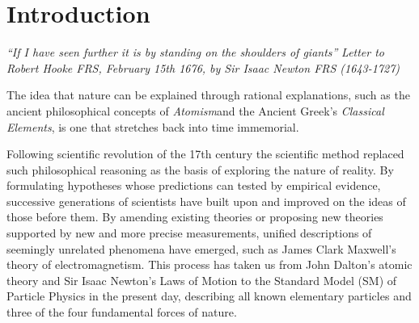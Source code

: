 \chapter{Introduction}\label{chapter:intro}

\emph{``If I have seen further it is by standing on the shoulders of giants''}
\emph{Letter to Robert Hooke FRS, February 15th 1676, by Sir Isaac Newton FRS (1643-1727)}

The idea that nature can be explained through rational explanations, such as the ancient philosophical concepts of \emph{Atomism}and the Ancient Greek's \emph{Classical Elements}, is one that stretches back into time immemorial.

Following scientific revolution of the 17th century the scientific method replaced such philosophical reasoning as the basis of exploring the nature of reality.
By formulating hypotheses whose predictions can tested by empirical evidence, successive generations of scientists
have built upon and improved on the ideas of those before them.
By amending existing theories or proposing new theories supported by new and more precise measurements, unified descriptions of seemingly unrelated phenomena have emerged, such as James Clark Maxwell's theory of electromagnetism.
This process has taken us from John Dalton's atomic theory and Sir Isaac Newton's Laws of Motion to the Standard Model (SM) of Particle Physics in the present day, describing all known elementary particles and three of the four fundamental forces of nature.


